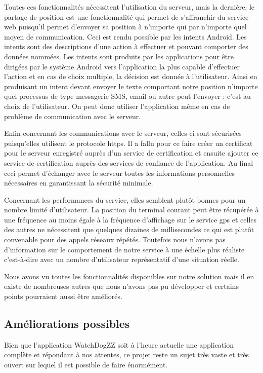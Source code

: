 Toutes ces fonctionnalités nécessitent l’utilisation du serveur, mais la dernière, le partage de position est une fonctionnalité qui permet de s’affranchir du service web puisqu’il permet d’envoyer sa position à n’importe qui par n’importe quel moyen de communication. Ceci est rendu possible par les intents Android. Les intents sont des descriptions d’une action à effectuer et pouvant comporter des données nommées. Les intents sont produits par les applications pour être dirigées par le système Android vers l’application la plus capable d’effectuer l’action et en cas de choix multiple, la décision est donnée à l’utilisateur. Ainsi en produisant un intent devant envoyer le texte comportant notre position n’importe quel processus de type messagerie SMS, email ou autre peut l’envoyer : c’est au choix de l’utilisateur. On peut donc utiliser l’application même en cas de problème de communication avec le serveur.

Enfin concernant les communications avec le serveur, celles-ci sont sécurisées puisqu’elles utilisent le protocole https. Il a fallu pour ce faire créer un certificat pour le serveur enregistré auprès d’un service de certification et ensuite ajouter ce service de certification auprès des services de confiance de l’application. Au final ceci permet d’échanger avec le serveur toutes les informations personnelles nécessaires en garantissant la sécurité minimale.

Concernant les performances du service, elles semblent plutôt bonnes pour un nombre limité d’utilisateur. La position du terminal courant peut être récupérée à une fréquence au moins égale à la fréquence d’affichage sur le service gps et celles des autres ne nécessitent que quelques dizaines de millisecondes ce qui est plutôt convenable pour des appels réseaux répétés. Toutefois nous n’avons pas d’information sur le comportement de notre service à une échelle plus réaliste c’est-à-dire avec un nombre d’utilisateur représentatif d’une situation réelle.

Nous avons vu toutes les fonctionnalités disponibles sur notre solution mais il en existe de nombreuses autres que nous n’avons pas pu développer et certains points pourraient aussi être améliorés.

\subsection{Améliorations possibles}

Bien que l'application WatchDogZZ soit à l'heure actuelle une application complète et répondant à nos attentes, ce projet reste un sujet très vaste et très ouvert sur lequel il est possible de faire énormément.
